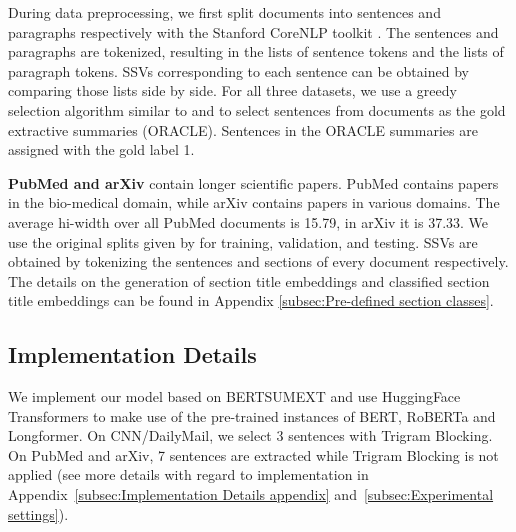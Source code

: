 \documentclass[11pt]{article}
\begin{document}
During data preprocessing, we first split documents into sentences and paragraphs respectively with the Stanford CoreNLP toolkit \cite{manning-etal-2014-stanford}. The sentences and paragraphs are tokenized, resulting in the lists of sentence tokens and the lists of paragraph tokens. SSVs corresponding to each sentence can be obtained by comparing those lists side by side. For all three datasets, we use a greedy selection algorithm similar to \citet{summarunner} and \citet{presumm} to select sentences from documents as the gold extractive summaries (ORACLE). Sentences in the ORACLE summaries are assigned with the gold label 1. 

\textbf{PubMed and arXiv} contain longer scientific papers. PubMed contains papers in the bio-medical domain, while arXiv contains papers in various domains.  The average hi-width over all PubMed documents is 15.79, in arXiv it is 37.33. 
We use the original splits  given by \citet{pubmed} for training, validation, and testing. SSVs are obtained by tokenizing the sentences and sections of every document respectively. The details on the generation of section title embeddings and classified section title embeddings can be found in Appendix \ref{subsec:Pre-defined section classes}.




\subsection{Implementation Details}
\label{subsec:details}
We implement our model based on BERTSUMEXT \cite{presumm}
and use HuggingFace Transformers \cite{wolf-etal-2020-transformers} to make use of the pre-trained instances of BERT, RoBERTa and Longformer. 
On CNN/DailyMail, we select 3 sentences with Trigram Blocking. On PubMed and arXiv, 7 sentences are extracted while Trigram Blocking is not applied (see more details with regard to implementation in Appendix~\ref{subsec:Implementation Details appendix} and~\ref{subsec:Experimental settings}).
\end{document}
